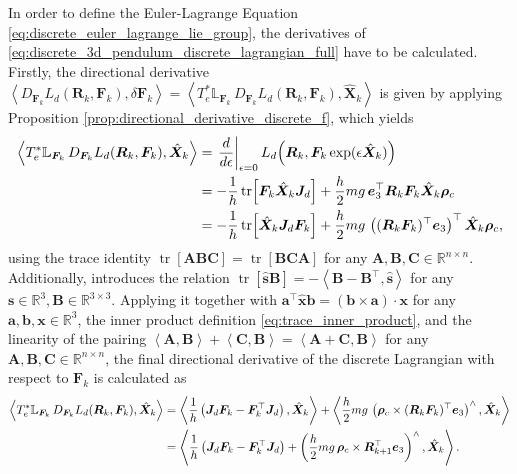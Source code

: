 In order to define the Euler-Lagrange Equation \eqref{eq:discrete_euler_lagrange_lie_group}, the derivatives of \eqref{eq:discrete_3d_pendulum_discrete_lagrangian_full} have to be calculated. Firstly, the directional derivative $\left\langle D_{\bm{F}_k}L_d(\bm{R}_k, \bm{F}_k), \delta \bm{F}_k \right\rangle = \left\langle
T_e^*\mathbb{L}_{\bm{F}_k}\,D_{\bm{F}_k}L_d(\bm{R}_k,\bm{F}_k),
\hat{\bm{X}}_k
\right\rangle$ is given by applying Proposition \eqref{prop:directional_derivative_discrete_f}, which yields
{\small
\begin{align}
\left\langle
T_e^*\mathbb{L}_{\bm{F}_k}\,D_{\bm{F}_k}L_d(\bm{R}_k,\bm{F}_k),
\hat{\bm{X}}_k
\right\rangle
&=
\left.\frac{d}{d\epsilon}\right|_{\epsilon=0}
L_d\!\left(
\bm{R}_k,\bm{F}_k\exp(\epsilon\hat{\bm{X}}_k)
\right)
\notag\\
&=
-\frac{1}{h}\operatorname{tr}\!\left[
\bm{F}_k\hat{\bm{X}}_k \bm{J}_d
\right]
+\frac{h}{2}mg\,\bm{e}_3^{\top}\bm{R}_k\bm{F}_k
\hat{\bm{X}}_k\bm{\rho}_c
\notag\\
&=
-\frac{1}{h}\operatorname{tr}\!\left[
\hat{\bm{X}}_k\bm{J}_d\bm{F}_k
\right]
+\frac{h}{2}mg\,
\left((\bm{R}_k \bm{F}_k)^{\top}\bm{e}_3\right)^{\top}
\hat{\bm{X}}_k\bm{\rho}_c,
\notag
\end{align}}
using the trace identity $\operatorname{tr}[\bm{A}\bm{B}\bm{C}] = \operatorname{tr}[\bm{B}\bm{C}\bm{A}]$ for any $\bm{A}, \bm{B}, \bm{C} \in \mathbb{R}^{n \times n}$. Additionally, \cite{Lee2008} introduces the relation $\operatorname{tr}[\hat{\bm{s}}\bm{B}] = - \left\langle \bm{B}-\bm{B}^\top, \hat{\bm{s}} \right\rangle$ for any $\bm{s} \in \mathbb{R}^3,\bm{B} \in \mathbb{R}^{3 \times 3}$. Applying it together with $\bm{a}^\top \hat{\bm{x}}\bm{b} = (\bm{b} \times \bm{a}) \cdot \bm{x}$ for any $\bm{a}, \bm{b}, \bm{x} \in \mathbb{R}^3$, the inner product definition \eqref{eq:trace_inner_product}, and the linearity of the pairing $\left\langle \bm{A}, \bm{B} \right\rangle + \left\langle \bm{C}, \bm{B} \right\rangle = \left\langle \bm{A}+\bm{C},\bm{B} \right\rangle$ for any $\bm{A}, \bm{B}, \bm{C} \in \mathbb{R}^{n \times n}$, the final directional derivative of the discrete Lagrangian with respect to $\bm{F}_k$ is calculated as
{\small
\begin{align}
\left\langle
T_e^*\mathbb{L}_{\bm{F}_k}\,D_{\bm{F}_k}L_d(\bm{R}_k,\bm{F}_k),
\hat{\bm{X}}_k
\right\rangle
&=
\left\langle
\frac{1}{h}
\left(\bm{J}_d\bm{F}_k-\bm{F}_k^{\top}\bm{J}_d\right),
\hat{\bm{X}}_k
\right\rangle
+\left\langle
\frac{h}{2}mg\,
\left(
\bm{\rho}_c\times (\bm{R}_k\bm{F}_k)^{\top}\bm{e}_3
\right)^\wedge,
\hat{\bm{X}}_k
\right\rangle
\notag\\
&=
\left\langle
\frac{1}{h}
\left(\bm{J}_d\bm{F}_k-\bm{F}_k^{\top}\bm{J}_d\right)
+
\left(
\frac{h}{2}mg\,
\bm{\rho}_c\times \bm{R}_{k+1}^{\top}\bm{e}_3
\right)^\wedge,
\hat{\bm{X}}_k
\right\rangle. \notag
\end{align}}
